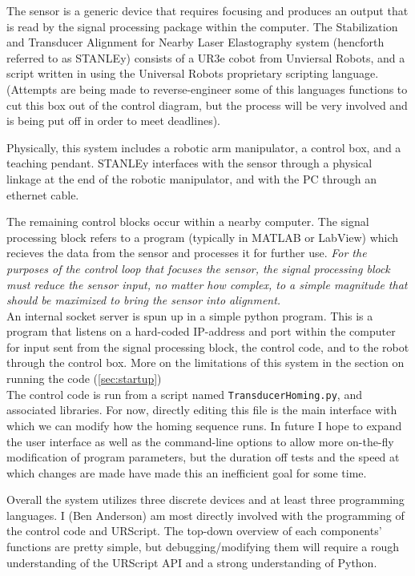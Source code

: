 \documentclass[11pt]{article}
\begin{document}
The sensor is a generic device that requires focusing and produces an output that is read by the signal processing package within the computer. The Stabilization and Transducer Alignment for Nearby Laser Elastography system (hencforth referred to as STANLEy) consists of a UR3e cobot from Unviersal Robots, and a script written in using the Universal Robots proprietary scripting language. \\
(Attempts are being made to reverse-engineer some of this languages functions to cut this box out of the control diagram, but the process will be very involved and is being put off in order to meet deadlines).

Physically, this system includes a robotic arm manipulator, a control box, and a teaching pendant.
STANLEy interfaces with the sensor through a physical linkage at the end of the robotic manipulator, and with the PC through an ethernet cable.

The remaining control blocks occur within a nearby computer. The signal processing block refers to a program (typically in MATLAB or LabView) which recieves the data from the sensor and processes it for further use. 
\emph{For the purposes of the control loop that focuses the sensor, the signal processing block must reduce the sensor input, no matter how complex, to a simple magnitude that should be maximized to bring the sensor into alignment.}\\
An internal socket server is spun up in a simple python program. This is a program that listens on a hard-coded IP-address and port within the computer for input sent from the signal processing block, the control code, and to the robot through the control box. More on the limitations of this system in the section on running the code (\autoref{sec:startup})\\
The control code is run from a script named \texttt{TransducerHoming.py}, and associated libraries. For now, directly editing this file is the main interface with which we can modify how the homing sequence runs.
In future I hope to expand the user interface as well as the command-line options to allow more on-the-fly modification of program parameters, but the duration off tests and the speed at which changes are made have made this an inefficient goal for some time.

Overall the system utilizes three discrete devices and at least three programming languages. I (Ben Anderson) am most directly involved with the programming of the control code and URScript. The top-down overview of each components' functions are pretty simple, but debugging/modifying them will require a rough understanding of the URScript API and a strong understanding of Python.
\end{document}
